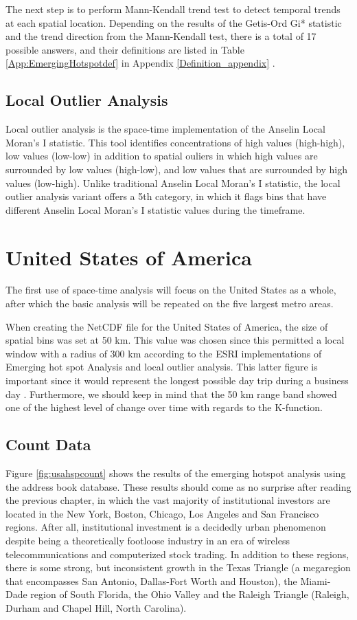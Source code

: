 The next step is to perform Mann-Kendall trend test to detect temporal trends at each spatial location. Depending on the results of the Getis-Ord Gi* statistic and the trend direction from the Mann-Kendall test, there is a total of 17 possible answers, and their definitions are listed in Table \ref{App:EmergingHotspotdef} in Appendix \ref{Definition_appendix} \citep{Esri}.

\subsection{Local Outlier Analysis}

Local outlier analysis is the space-time implementation of the Anselin Local Moran's I statistic.  This tool identifies concentrations of high values (high-high), low values (low-low) in addition to spatial ouliers in which high values are surrounded by low values (high-low), and low values that are surrounded by high values (low-high).  Unlike traditional Anselin Local Moran's I statistic, the local outlier analysis variant offers a 5th category, in which it flags bins that have different Anselin Local Moran's I statistic values during the timeframe.  

\section{United States of America}

The first use of space-time analysis will focus on the United States as a whole, after which the basic analysis will be repeated on the five largest metro areas. 

When creating the NetCDF file for the United States of America, the size of spatial bins was set at 50 km.  This value was chosen since this permitted a local window with a radius of 300 km according to the ESRI implementations of Emerging hot spot Analysis and local outlier analysis.  This latter figure is important since it would represent the longest possible day trip during a business day \citep{Fritsch06}.  Furthermore, we should keep in mind that the 50 km range band showed one of the highest level of change over time with regards to the K-function.  

\subsection{Count Data}

Figure \ref{fig:usahspcount} shows the results of the emerging hotspot analysis using the address book database. These results should come as no surprise after reading the previous chapter, in which the vast majority of institutional investors are located in the New York, Boston, Chicago, Los Angeles and San Francisco regions.  After all, institutional investment is a decidedly urban phenomenon despite being a theoretically footloose industry in an era of wireless telecommunications and computerized stock trading.  In addition to these regions, there is some strong, but inconsistent growth in the Texas Triangle (a megaregion that encompasses San Antonio, Dallas-Fort Worth and Houston), the Miami-Dade region of South Florida, the Ohio Valley and the Raleigh Triangle (Raleigh, Durham and Chapel Hill, North Carolina).  


